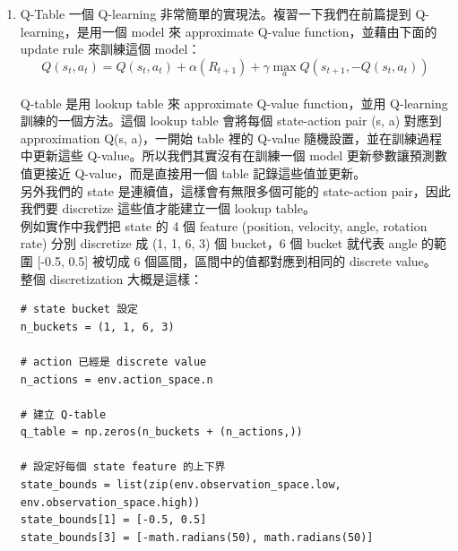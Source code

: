 \documentclass[a4paper,12pt]{article}
\begin{document}
\begin{enumerate}
\begin{enumerate}
在更新 Q table 時，計算 reward 不只包含採取 action \(a\)獲得的 reward \(r\)r，還包含 \(\gamma max_{a^{'}}Q(s^{'},q^{'})\)。這個概念是，agent 不僅僅看當下採取的行動帶來的好處，他也會估計到達下一個 state \(s^{'}\) 後，最多可以有多少好處（因為在\(s^{'}\)也可以採取各種 action）。\\
換句話說，這個 agent 不是一個目光如豆的 agent，他會考慮未來。因為加上了\(\gamma max_{a^{'}}Q(s^{'},q^{'})\)(當然\(\gamma\)不能是 0)，讓我們的 agent 從 會立刻吃掉棉花糖的小朋友，進化成可以晚一點再吃多一點棉花糖的小朋友，是不是很有趣呢！\\
\item Q-Table
\label{sec:org913f28b}
一個 Q-learning 非常簡單的實現法。複習一下我們在前篇提到 Q-learning，是用一個 model 來 approximate Q-value function，並藉由下面的 update rule 來訓練這個 model：\\
$$ Q(s_t,a_t) = Q(s_t,a_t) + \alpha(R_{t+1}) + \gamma \max_{a} Q(s_{t+1}, - Q(s_t,a_t)) $$\\
Q-table 是用 lookup table 來 approximate Q-value function，並用 Q-learning 訓練的一個方法。這個 lookup table 會將每個 state-action pair (s, a) 對應到 approximation Q(s, a)，一開始 table 裡的 Q-value 隨機設置，並在訓練過程中更新這些 Q-value。所以我們其實沒有在訓練一個 model 更新參數讓預測數值更接近 Q-value，而是直接用一個 table 記錄這些值並更新。\\

另外我們的 state 是連續值，這樣會有無限多個可能的 state-action pair，因此我們要 discretize 這些值才能建立一個 lookup table。\\

例如實作中我們把 state 的 4 個 feature (position, velocity, angle, rotation rate) 分別 discretize 成 (1, 1, 6, 3) 個 bucket，6 個 bucket 就代表 angle 的範圍 [-0.5, 0.5] 被切成 6 個區間，區間中的值都對應到相同的 discrete value。\\

整個 discretization 大概是這樣：\\
\lstset{breaklines=true,language=Python,label= ,caption= ,captionpos=b,firstnumber=1,numbers=left}
\begin{lstlisting}
# state bucket 設定
n_buckets = (1, 1, 6, 3)

# action 已經是 discrete value
n_actions = env.action_space.n

# 建立 Q-table
q_table = np.zeros(n_buckets + (n_actions,))

# 設定好每個 state feature 的上下界
state_bounds = list(zip(env.observation_space.low, env.observation_space.high))
state_bounds[1] = [-0.5, 0.5]
state_bounds[3] = [-math.radians(50), math.radians(50)]


\end{lstlisting}
\end{enumerate}
\end{enumerate}
\end{document}
